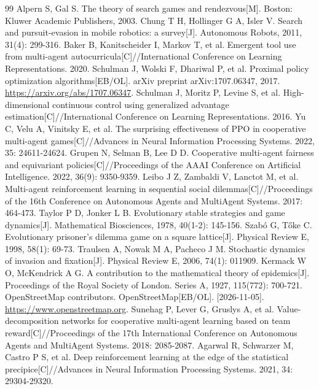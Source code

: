 \documentclass[a4paper,zihao=5,fontset=fandol,UTF8]{ctexart}
\begin{document}
\renewcommand{\refname}{\normalsize\normalfont 参考文献：}
\begin{thebibliography}{99}
\small
\setlength{\itemsep}{0pt}
 Alpern S, Gal S. The theory of search games and rendezvous[M]. Boston: Kluwer Academic Publishers, 2003.
 Chung T H, Hollinger G A, Isler V. Search and pursuit-evasion in mobile robotics: a survey[J]. Autonomous Robots, 2011, 31(4): 299-316.
 Baker B, Kanitscheider I, Markov T, et al. Emergent tool use from multi-agent autocurricula[C]//International Conference on Learning Representations. 2020.
 Schulman J, Wolski F, Dhariwal P, et al. Proximal policy optimization algorithms[EB/OL]. arXiv preprint arXiv:1707.06347, 2017. \url{https://arxiv.org/abs/1707.06347}.
 Schulman J, Moritz P, Levine S, et al. High-dimensional continuous control using generalized advantage estimation[C]//International Conference on Learning Representations. 2016.
 Yu C, Velu A, Vinitsky E, et al. The surprising effectiveness of PPO in cooperative multi-agent games[C]//Advances in Neural Information Processing Systems. 2022, 35: 24611-24624.
 Grupen N, Selman B, Lee D D. Cooperative multi-agent fairness and equivariant policies[C]//Proceedings of the AAAI Conference on Artificial Intelligence. 2022, 36(9): 9350-9359.
 Leibo J Z, Zambaldi V, Lanctot M, et al. Multi-agent reinforcement learning in sequential social dilemmas[C]//Proceedings of the 16th Conference on Autonomous Agents and MultiAgent Systems. 2017: 464-473.
 Taylor P D, Jonker L B. Evolutionary stable strategies and game dynamics[J]. Mathematical Biosciences, 1978, 40(1-2): 145-156.
 Szabó G, Tőke C. Evolutionary prisoner's dilemma game on a square lattice[J]. Physical Review E, 1998, 58(1): 69-73.
 Traulsen A, Nowak M A, Pacheco J M. Stochastic dynamics of invasion and fixation[J]. Physical Review E, 2006, 74(1): 011909.
 Kermack W O, McKendrick A G. A contribution to the mathematical theory of epidemics[J]. Proceedings of the Royal Society of London. Series A, 1927, 115(772): 700-721.
 OpenStreetMap contributors. OpenStreetMap[EB/OL]. [2026-11-05]. \url{https://www.openstreetmap.org}.
 Sunehag P, Lever G, Gruslys A, et al. Value-decomposition networks for cooperative multi-agent learning based on team reward[C]//Proceedings of the 17th International Conference on Autonomous Agents and MultiAgent Systems. 2018: 2085-2087.
 Agarwal R, Schwarzer M, Castro P S, et al. Deep reinforcement learning at the edge of the statistical precipice[C]//Advances in Neural Information Processing Systems. 2021, 34: 29304-29320.
\end{thebibliography}
\end{document}
